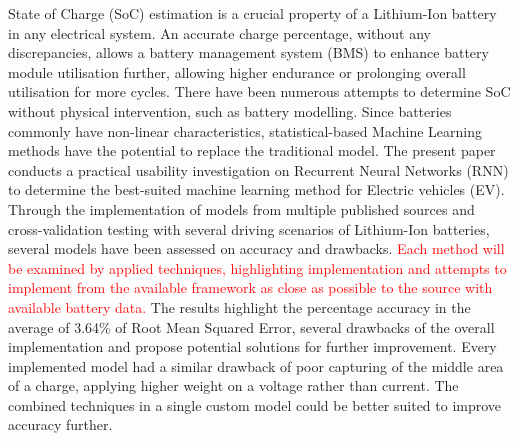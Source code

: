 %
{
State of Charge (SoC) estimation is a crucial property of a Lithium-Ion battery in any electrical system.
An accurate charge percentage, without any discrepancies, allows a battery management system (BMS) to enhance battery module utilisation further, allowing higher endurance or prolonging overall utilisation for more cycles.
There have been numerous attempts to determine SoC without physical intervention, such as battery modelling.
Since batteries commonly have non-linear characteristics, statistical-based Machine Learning methods have the potential to replace the traditional model.
The present paper conducts a practical usability investigation on Recurrent Neural Networks (RNN) to determine the best-suited machine learning method for Electric vehicles (EV).
Through the implementation of models from multiple published sources and cross-validation testing with several driving scenarios of Lithium-Ion batteries, several models have been assessed on accuracy and drawbacks.%
\textcolor{red}{Each method will be examined by applied techniques, highlighting implementation and attempts to implement from the available framework as close as possible to the source with available battery data.}
The results highlight the percentage accuracy in the average of 3.64\% of Root Mean Squared Error, several drawbacks of the overall implementation and propose potential solutions for further improvement.
Every implemented model had a similar drawback of poor capturing of the middle area of a charge, applying higher weight on a voltage rather than current.
The combined techniques in a single custom model could be better suited to improve accuracy further.
}
